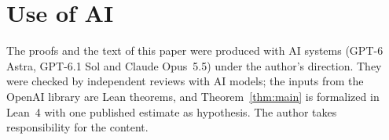 \documentclass[11pt]{article}
\theoremstyle{definition}
\begin{document}


\section*{Use of AI}
The proofs and the text of this paper were produced with AI systems (GPT-6 Astra, GPT-6.1 Sol and Claude Opus~5.5) under the author's direction. They were checked by independent reviews with AI models; the inputs from the OpenAI library are Lean theorems, and Theorem~\ref{thm:main} is formalized in Lean~4 with one published estimate as hypothesis. The author takes responsibility for the content.
\end{document}
